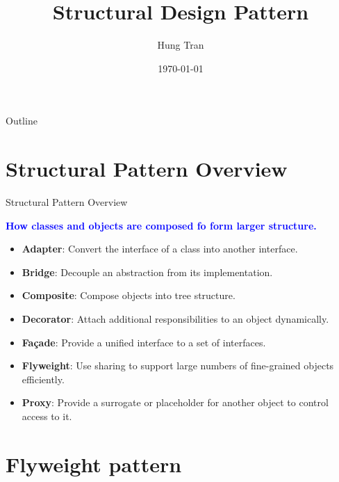 \documentclass[13pt]{beamer}
\title[Design Pattern]{Structural Design Pattern}
\author{Hung Tran}
\institute{Fpt software}
\date{\today}
\begin{document}
\begin{frame}
\titlepage
\end{frame}

\begin{frame}{Outline}
\tableofcontents
\end{frame}

\section{Structural Pattern Overview}

\begin{frame}{Structural Pattern Overview}
	\begin{center}
	\textcolor{blue}{\textbf{How classes and objects are composed fo form larger structure.}}
	\end{center}
	\begin{itemize}
		\item \textbf{Adapter}: Convert the interface of a class into another interface.
		\item \textbf{Bridge}: Decouple an abstraction from its implementation.
		\item \textbf{Composite}: Compose objects into tree structure.
		\item \textbf{Decorator}: Attach additional responsibilities to an object dynamically.
		\item \textbf{Façade}: Provide a unified interface to a set of interfaces.
		\item \textbf{Flyweight}: Use sharing to support large numbers of fine-grained objects efficiently.
		\item \textbf{Proxy}: Provide a surrogate or placeholder for another object to control access to it.
	\end{itemize}
\end{frame}

\section{Flyweight pattern}
\end{document}
